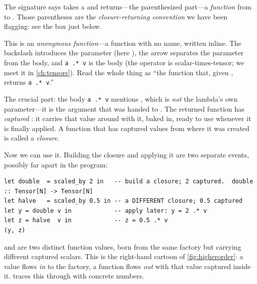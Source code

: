\begin{description}[style=nextline,leftmargin=1.5em]
  \item[The codomain \code{(Tensor[N] -> Tensor[N])}.] The
  signature says  takes a  and returns---the
  parenthesized part---a \emph{function} from  to .
  Those parentheses are the \emph{closure-returning convention} we have been
  flagging: see the box just below.
  \item[The lambda \code{\textbackslash v -> a .* v}.] This is an
  \emph{anonymous function}---a function with no name, written inline. The
  backslash \code{\textbackslash} introduces the parameter (here ), the
  arrow \code{->} separates the parameter from the body, and
  \lstinline[style=l4style]|a .* v| is the body (the operator  is
  scalar-times-tensor; we meet it in \cref{ch:tensors}). Read the whole thing as
  ``the function that, given , returns \lstinline[style=l4style]|a .* v|.''
  \item[The capture.] The crucial part: the body
  \lstinline[style=l4style]|a .* v| mentions , which is \emph{not} the
  lambda's own parameter---it is the argument that was handed to .
  The returned function has \emph{captured} : it carries that value around
  with it, baked in, ready to use whenever it is finally applied. A function that
  has captured values from where it was created is called a \emph{closure}.
\end{description}

\noindent Now we can use it. Building the closure and applying it are two separate
events, possibly far apart in the program:

\begin{lstlisting}[style=l4style]
let double  = scaled_by 2 in   -- build a closure; 2 captured.  double :: Tensor[N] -> Tensor[N]
let halve   = scaled_by 0.5 in -- a DIFFERENT closure; 0.5 captured
let y = double v in            -- apply later: y = 2 .* v
let z = halve  v in            -- z = 0.5 .* v
(y, z)
\end{lstlisting}

\noindent {} and  are two distinct function values, born
from the same factory but carrying different captured scalars. This is the
right-hand cartoon of \cref{fig:higherorder}: a value flows \emph{in} to the
factory, a function flows \emph{out} with that value captured inside it.
 traces this through with concrete numbers.

